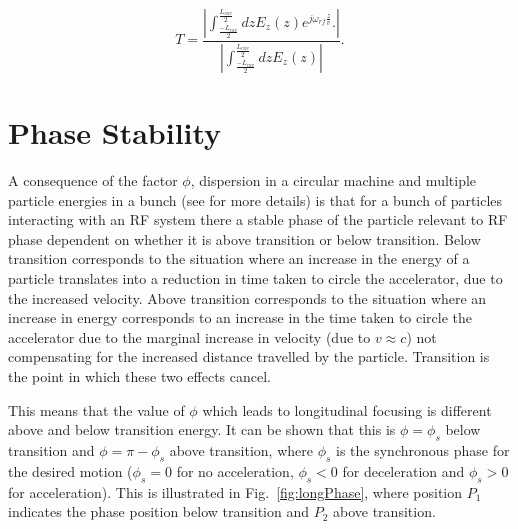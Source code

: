 \begin{equation}
T =    \frac{\left| \int^{\frac{L_{cav}}{2}}_{\frac{-L_{cav}}{2}} dz E_{z}\left( z \right) e^{j \omega_{rf} \frac{z}{v}}.\right|}{  \left| \int^{\frac{L_{cav}}{2}}_{\frac{-L_{cav}}{2}} dz E_{z}\left( z \right) \right|}.
\end{equation}

\section{Phase Stability}

A consequence of the factor $\phi$, dispersion in a circular machine and multiple particle energies in a bunch (see \cite{Leduff:LongDyn} for more details) is that for a bunch of particles interacting with an RF system there a stable phase of the particle relevant to RF phase dependent on whether it is above transition or below transition. Below transition corresponds to the situation where an increase in the energy of a particle translates into a reduction in time taken to circle the accelerator, due to the increased velocity. Above transition corresponds to the situation where an increase in energy corresponds to an increase in the time taken to circle the accelerator due to the marginal increase in velocity (due to $v \approx c$) not compensating for the increased distance travelled by the particle. Transition is the point in which these two effects cancel.

This means that the value of $\phi$ which leads to longitudinal focusing is different above and below transition energy. It can be shown that this is $\phi = \phi_{s}$ below transition and $\phi = \pi - \phi_{s}$ above transition, where $\phi_{s}$ is the synchronous phase for the desired motion ($\phi_{s} = 0$ for no acceleration, $\phi_{s} < 0$ for deceleration and $\phi_{s} > 0$ for acceleration). This is illustrated in Fig.~\ref{fig:longPhase}, where position $P_{1}$ indicates the phase position below transition and $P_{2}$ above transition.

